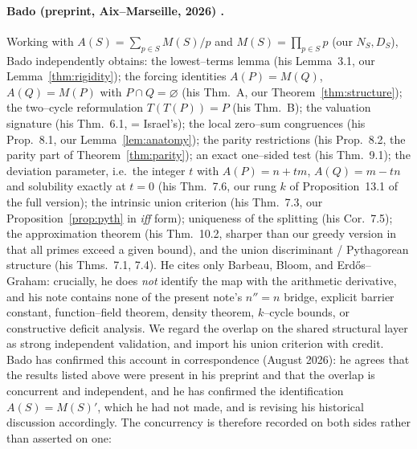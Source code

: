 \documentclass[11pt]{article}
\theoremstyle{definition}
\begin{document}
\paragraph{Bado (preprint, Aix--Marseille, 2026) \cite{Bado2026}.}
Working with $A(S)=\sum_{p\in S}M(S)/p$ and $M(S)=\prod_{p\in S}p$ (our $N_S,D_S$), Bado independently
obtains: the lowest--terms lemma (his Lemma~3.1, our Lemma~\ref{thm:rigidity}); the forcing identities
$A(P)=M(Q)$, $A(Q)=M(P)$ with $P\cap Q=\varnothing$ (his Thm.~A, our Theorem~\ref{thm:structure}); the
two--cycle reformulation $T(T(P))=P$ (his Thm.~B); the valuation signature (his Thm.~6.1, = Israel's);
the local zero--sum congruences (his Prop.~8.1, our Lemma~\ref{lem:anatomy}); the parity restrictions
(his Prop.~8.2, the parity part of Theorem~\ref{thm:parity}); an exact one--sided test (his Thm.~9.1); the deviation parameter, i.e.\ the integer $t$ with
$A(P)=n+tm$, $A(Q)=m-tn$ and solubility exactly at $t=0$ (his Thm.~7.6, our rung $k$ of
Proposition~13.1 of the full version); the intrinsic union criterion (his Thm.~7.3, our
Proposition~\ref{prop:pyth} in \emph{iff} form); uniqueness of the splitting (his Cor.~7.5);
the approximation theorem (his Thm.~10.2, sharper than our greedy version in that all primes exceed a
given bound), and the union discriminant / Pythagorean structure (his Thms.~7.1, 7.4). He cites only
Barbeau, Bloom, and Erd\H{o}s--Graham: crucially, he does \emph{not} identify the map with the
arithmetic derivative, and his note contains none of the present note's $n''=n$ bridge, explicit
barrier constant, function--field theorem, density theorem, $k$--cycle bounds, or constructive
deficit analysis. We regard the overlap on the shared structural layer as strong independent
validation, and import his union criterion with credit. Bado has confirmed this account in
correspondence (August 2026): he agrees that the results listed above were present in his
preprint and that the overlap is concurrent and independent, and he has confirmed the
identification $A(S)=M(S)'$, which he had not made, and is revising his historical discussion
accordingly. The concurrency is therefore recorded on both sides rather than asserted on one:
\end{document}
